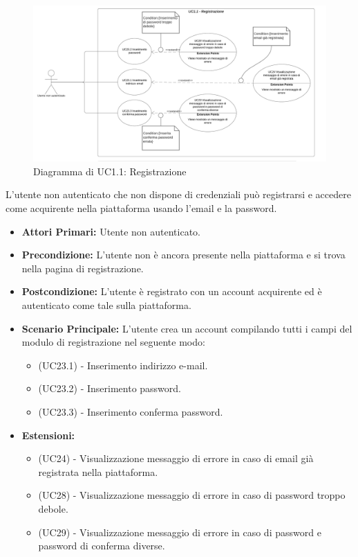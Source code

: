 \begin{figure}[H]
    \centering
    \includegraphics[scale=0.6]{Immagini/DiagrammiUC/UC1.1Registrazione}
    \caption{Diagramma di UC1.1: Registrazione}
    \label{fig:Registrazione}
\end{figure}

L'utente non autenticato che non dispone di credenziali può registrarsi e accedere come acquirente nella piattaforma usando l'email e la password.
\begin{itemize}
    \item \textbf{Attori Primari:} Utente non autenticato.
    \item \textbf{Precondizione:} L'utente non è ancora presente nella piattaforma e si trova nella pagina di registrazione.
    \item \textbf{Postcondizione:} L'utente è registrato con un account acquirente ed è autenticato come tale sulla piattaforma.
    \item \textbf{Scenario Principale:} L'utente crea un account compilando tutti i campi del modulo di registrazione nel seguente modo:
    \begin{itemize}
        \item (UC23.1) - Inserimento indirizzo e-mail.
        \item (UC23.2) - Inserimento password.
        \item (UC23.3) - Inserimento conferma password.
    \end{itemize}
    \item \textbf{Estensioni:}
    \begin{itemize}
        \item (UC24) - Visualizzazione messaggio di errore in caso di email già registrata nella piattaforma.
        \item (UC28) - Visualizzazione messaggio di errore in caso di password troppo debole. 
        \item (UC29) - Visualizzazione messaggio di errore in caso di password e password di conferma diverse. 
    \end{itemize}
\end{itemize}

